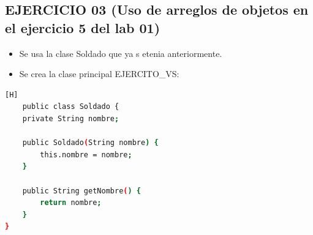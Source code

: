 \documentclass{article}
\begin{document}
\subsection{EJERCICIO 03 (Uso de arreglos de objetos en el ejercicio 5 del lab 01)}
	\begin{itemize}	
		\item Se usa la clase Soldado que ya s etenia anteriormente.
		\item Se crea la clase principal EJERCITO_VS:
	\end{itemize}
	
	\begin{lstlisting}[language=bash,caption={Creando la clase soldado}][H]
	public class Soldado {
    private String nombre;

    public Soldado(String nombre) {
        this.nombre = nombre;
    }

    public String getNombre() {
        return nombre;
    }
}
	
	
				\end{lstlisting}
			
\end{document}
